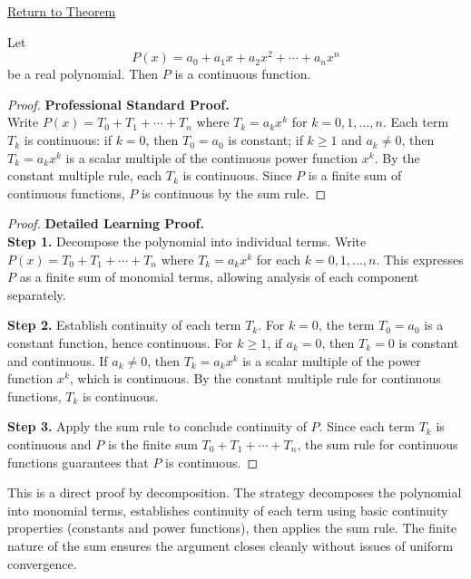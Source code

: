 \newpage
{}
\label{prf:polynomials-are-continuous}

\begin{remark*}[Return]
\hyperref[thm:polynomials-are-continuous]{Return to Theorem}
\end{remark*}

\begin{theorem*}
Let
\[
  P(x) = a_0 + a_1 x + a_2 x^2 + \cdots + a_n x^n
\]
be a real polynomial. Then $P$ is a continuous function.
\end{theorem*}

\begin{proof}
\textbf{Professional Standard Proof.}~\\
Write $P(x) = T_0 + T_1 + \cdots + T_n$ where $T_k = a_k x^k$ for $k = 0, 1, \ldots, n$. Each term $T_k$ is continuous: if $k = 0$, then $T_0 = a_0$ is constant; if $k \geq 1$ and $a_k \neq 0$, then $T_k = a_k x^k$ is a scalar multiple of the continuous power function $x^k$. By the constant multiple rule, each $T_k$ is continuous. Since $P$ is a finite sum of continuous functions, $P$ is continuous by the sum rule.
\end{proof}

\begin{proof}
\textbf{Detailed Learning Proof.}~\\

\textbf{Step 1.} Decompose the polynomial into individual terms. Write $P(x) = T_0 + T_1 + \cdots + T_n$ where $T_k = a_k x^k$ for each $k = 0, 1, \ldots, n$. This expresses $P$ as a finite sum of monomial terms, allowing analysis of each component separately.

\textbf{Step 2.} Establish continuity of each term $T_k$. For $k = 0$, the term $T_0 = a_0$ is a constant function, hence continuous. For $k \geq 1$, if $a_k = 0$, then $T_k = 0$ is constant and continuous. If $a_k \neq 0$, then $T_k = a_k x^k$ is a scalar multiple of the power function $x^k$, which is continuous. By the constant multiple rule for continuous functions, $T_k$ is continuous.

\textbf{Step 3.} Apply the sum rule to conclude continuity of $P$. Since each term $T_k$ is continuous and $P$ is the finite sum $T_0 + T_1 + \cdots + T_n$, the sum rule for continuous functions guarantees that $P$ is continuous.
\end{proof}

\begin{remark*}
This is a direct proof by decomposition. The strategy decomposes the polynomial into monomial terms, establishes continuity of each term using basic continuity properties (constants and power functions), then applies the sum rule. The finite nature of the sum ensures the argument closes cleanly without issues of uniform convergence.
\end{remark*}

